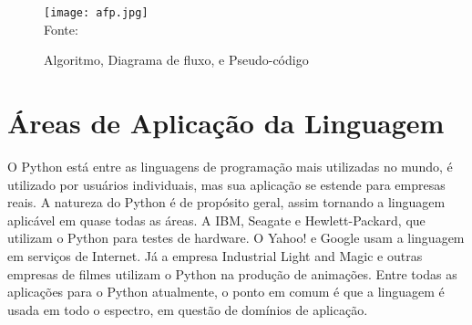    \begin{figure}[H]
    \begin{center}
        \caption{Algoritmo, Diagrama de fluxo, e Pseudo-código} \label{afp}
        \texttt{[image: afp.jpg]} \\
        {\tiny \sf Fonte: \cite[p. 93]{Sprankle2012} }
    \end{center}
   \end{figure}

   \section{Áreas de Aplicação da Linguagem}
   O Python está entre as linguagens de programação mais utilizadas no mundo, é utilizado por usuários individuais, mas sua aplicação se estende para empresas reais. A natureza do Python é de propósito geral, assim tornando a linguagem aplicável em quase todas as áreas. A IBM, Seagate e Hewlett-Packard, que utilizam o Python para testes de hardware. O Yahoo! e Google usam a linguagem em serviços de Internet. Já a empresa Industrial Light and Magic e outras empresas de filmes utilizam o Python na produção de animações. Entre todas as aplicações para o Python atualmente, o ponto em comum é que a linguagem é usada em todo o espectro, em questão de domínios de aplicação. \cite{Lutz2007}

